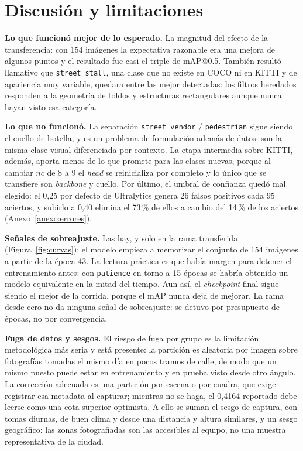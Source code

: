 \documentclass[10pt,a4paper]{article}
\begin{document}
\section{Discusión y limitaciones}
\textbf{Lo que funcionó mejor de lo esperado.} La magnitud del efecto de la
transferencia: con 154 imágenes la expectativa razonable era una mejora de algunos puntos
y el resultado fue casi el triple de mAP@0.5. También resultó llamativo que
\texttt{street\_stall}, una clase que no existe en COCO ni en KITTI y de apariencia muy
variable, quedara entre las mejor detectadas: los filtros heredados responden a la
geometría de toldos y estructuras rectangulares aunque nunca hayan visto esa categoría.

\textbf{Lo que no funcionó.} La separación \texttt{street\_vendor} /
\texttt{pedestrian} sigue siendo el cuello de botella, y es un problema de formulación
además de datos: son la misma clase visual diferenciada por contexto. La etapa intermedia
sobre KITTI, además, aporta menos de lo que promete para las clases nuevas, porque al
cambiar $nc$ de 8 a 9 el \emph{head} se reinicializa por completo y lo único que se
transfiere son \emph{backbone} y cuello. Por último, el umbral de confianza quedó mal
elegido: el 0{,}25 por defecto de Ultralytics genera 26 falsos positivos cada 95 aciertos,
y subirlo a 0{,}40 elimina el 73\,\% de ellos a cambio del 14\,\% de los aciertos
(Anexo~\ref{anexo:errores}).

\textbf{Señales de sobreajuste.} Las hay, y solo en la rama transferida
(Figura~\ref{fig:curvas}): el modelo empieza a memorizar el conjunto de 154 imágenes a
partir de la época 43. La lectura práctica es que había margen para detener el
entrenamiento antes: con \texttt{patience} en torno a 15 épocas se habría obtenido un
modelo equivalente en la mitad del tiempo. Aun así, el \emph{checkpoint} final sigue siendo
el mejor de la corrida, porque el mAP nunca deja de mejorar. La rama desde cero no
da ninguna señal de sobreajuste: se detuvo por presupuesto de épocas, no por
convergencia.

\textbf{Fuga de datos y sesgos.} El riesgo de fuga por grupo es la limitación
metodológica más seria y está presente: la partición es aleatoria por imagen sobre
fotografías tomadas el mismo día en pocos tramos de calle, de modo que un mismo puesto
puede estar en entrenamiento y en prueba visto desde otro ángulo. La corrección adecuada
es una partición por escena o por cuadra, que exige registrar esa metadata al capturar;
mientras no se haga, el 0{,}4164 reportado debe leerse como una cota superior optimista.
A ello se suman el sesgo de captura, con tomas diurnas, de buen clima y desde una
distancia y altura similares, y un sesgo geográfico: las zonas fotografiadas son las
accesibles al equipo, no una muestra representativa de la ciudad.
\end{document}

